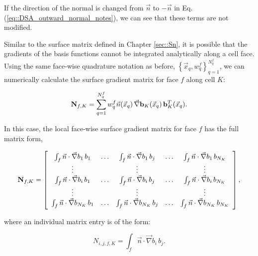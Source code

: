 \noindent If the direction of the normal is changed from $\vec{n}$ to $-\vec{n}$ in Eq. (\ref{eq::DSA_outward_normal_notes}), we can see that these terms are not modified. 

Similar to the surface matrix defined in Chapter \ref{sec::Sn}, it is possible that the gradients of the basis functions cannot be integrated analytically along a cell face. Using the same face-wise quadrature notation as before, $\left\{  \vec{x}_q , w_q^{f}  \right\}_{q=1}^{N_q^f}$, we can numerically calculate the surface gradient matrix for face $f$ along cell $K$:

\begin{equation}
\label{eq::DSA_surface_gradient_matrix_numerical}
{\bf N}_{f,K} =    \sum_{q = 1}^{N_q^f} w_{q}^f \vec{n} (\vec{x}_q) \, \vec{\nabla} {\bf b}_K (\vec{x}_q) \, {\bf b}_K^T (\vec{x}_q) .
\end{equation}

In this case, the local face-wise surface gradient matrix for face $f$ has the full matrix form,

\begin{equation}
\label{eq::DSA_surface_gradient_matrix_array}
{\bf N}_{f,K} =   \left[
\begin{array} {ccccc}
	\int_f \vec{n} \cdot\vec{\nabla}  b_1 \, b_1  & \ldots & \int_f \vec{n} \cdot \vec{\nabla} b_1 \, b_j  & \ldots & \int_f \vec{n} \cdot \vec{\nabla} b_1 \, b_{N_K} \\
	\vdots  &  & \vdots  &  & \vdots \\
	\int_f \vec{n}\cdot  \vec{\nabla} b_i \, b_1  & \ldots & \int_f \vec{n} \cdot\vec{\nabla}  b_i \, b_j  & \ldots & \int_f \vec{n}\cdot\vec{\nabla}  b_i \, b_{N_K} \\
	\vdots  &  & \vdots  &  & \vdots \\
	\int_f \vec{n} \cdot  \vec{\nabla} b_{N_K} \, b_1  & \ldots & \int_f \vec{n} \cdot  \vec{\nabla} b_{N_K} \, b_j  & \ldots & \int_f \vec{n} \cdot \vec{\nabla}  b_{N_K} \, b_{N_K} \\
\end{array}
\right] ,
\end{equation}

\noindent where an individual matrix entry is of the form:

\begin{equation}
\label{eq::DSA_surface_gradient_matrix_entry}
N_{i,j,f,K} =  \int_f \vec{n} \cdot  \vec{\nabla} b_i \, b_j .
\end{equation}

